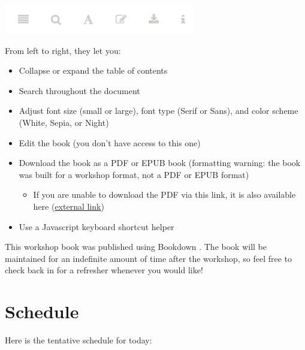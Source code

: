 \documentclass[
]{book}
\providecommand{\tightlist}{%
  \setlength{\itemsep}{0pt}\setlength{\parskip}{0pt}}
\begin{document}
\includegraphics[width=1\linewidth]{images/newrpack_files0}

From left to right, they let you:

\begin{itemize}
\tightlist
\item
  Collapse or expand the table of contents
\item
  Search throughout the document
\item
  Adjust font size (small or large), font type (Serif or Sans), and color scheme (White, Sepia, or Night)
\item
  Edit the book (you don't have access to this one)
\item
  Download the book as a PDF or EPUB book (formatting warning: the book was built for a workshop format, not a PDF or EPUB format)

  \begin{itemize}
  \tightlist
  \item
    If you are unable to download the PDF via this link, it is also available here (\href{https://github.com/michaeldumelle/R-Packages-Reproducible-Workflows-Book/blob/main/docs/_main.pdf}{external link})
  \end{itemize}
\item
  Use a Javascript keyboard shortcut helper
\end{itemize}

This workshop book was published using Bookdown \citep{xie2016bookdown}. The book will be maintained for an indefinite amount of time after the workshop, so feel free to check back in for a refresher whenever you would like!

\hypertarget{schedule}{%
\section*{Schedule}\label{schedule}}

Here is the tentative schedule for today:
\end{document}
